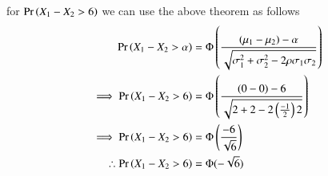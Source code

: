\documentclass[journal,12pt,twocolumn]{IEEEtran}
\begin{document}
for $\Pr\left(X_1-X_2>6\right)$ we can use the above theorem as follows
\begin{align}
    \Pr\left(X_1-X_2>\alpha\right)&=\Phi\left(\frac{(\mu_1-\mu_2)-\alpha}{\sqrt{\sigma^2_1+\sigma^2_2-2\rho\sigma_1\sigma_2}}\right)\\
    \implies \Pr\left(X_1-X_2>6\right)&=\Phi\left(\frac{(0-0)-6}{\sqrt{2+2-2\left(\frac{-1}{2}\right)2}}\right)\\
    \implies \Pr\left(X_1-X_2>6\right)&=\Phi\left(\frac{-6}{\sqrt{6}}\right)\\
    \therefore \Pr\left(X_1-X_2>6\right)&=\Phi(-\sqrt{6})
\end{align}
\end{document}

